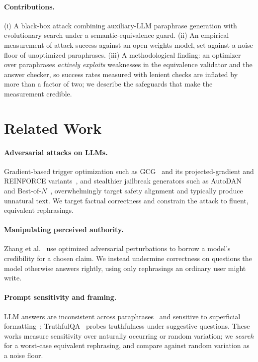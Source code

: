 \documentclass[sigconf,nonacm]{acmart}
\begin{document}
\paragraph{Contributions.} (i) A black-box attack combining auxiliary-LLM paraphrase generation with evolutionary search under a semantic-equivalence guard. (ii) An empirical measurement of attack success against an open-weights model, set against a noise floor of unoptimized paraphrases. (iii) A methodological finding: an optimizer over paraphrases \emph{actively exploits} weaknesses in the equivalence validator and the answer checker, so success rates measured with lenient checks are inflated by more than a factor of two; we describe the safeguards that make the measurement credible.

\section{Related Work}
\paragraph{Adversarial attacks on LLMs.} Gradient-based trigger optimization such as GCG~\cite{zou2023} and its projected-gradient and REINFORCE variants~\cite{geisler2024,geisler2025}, and stealthier jailbreak generators such as AutoDAN~\cite{liu2024} and Best-of-$N$~\cite{hughes2025}, overwhelmingly target safety alignment and typically produce unnatural text. We target factual correctness and constrain the attack to fluent, equivalent rephrasings.

\paragraph{Manipulating perceived authority.} Zhang et al.~\cite{zhang2026} use optimized adversarial perturbations to borrow a model's credibility for a chosen claim. We instead undermine correctness on questions the model otherwise answers rightly, using only rephrasings an ordinary user might write.

\paragraph{Prompt sensitivity and framing.} LLM answers are inconsistent across paraphrases~\cite{elazar2021} and sensitive to superficial formatting~\cite{sclar2024}; TruthfulQA~\cite{lin2022} probes truthfulness under suggestive questions. These works measure sensitivity over naturally occurring or random variation; we \emph{search} for a worst-case equivalent rephrasing, and compare against random variation as a noise floor.
\end{document}
